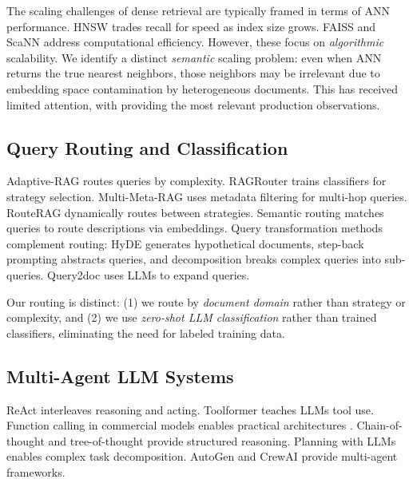 \documentclass[11pt,a4paper]{article}
\begin{document}
The scaling challenges of dense retrieval are typically framed in terms of ANN performance. HNSW \cite{malkov2020hnsw} trades recall for speed as index size grows. FAISS \cite{johnson2021faiss} and ScaNN \cite{guo2020scann} address computational efficiency. However, these focus on \textit{algorithmic} scalability. We identify a distinct \textit{semantic} scaling problem: even when ANN returns the true nearest neighbors, those neighbors may be irrelevant due to embedding space contamination by heterogeneous documents. This has received limited attention, with \citet{barnett2024observations} providing the most relevant production observations.

\subsection{Query Routing and Classification}

Adaptive-RAG \cite{jeong2024adaptiverag} routes queries by complexity. RAGRouter \cite{ragrouter2025} trains classifiers for strategy selection. Multi-Meta-RAG \cite{zohar2024multimetarag} uses metadata filtering for multi-hop queries. RouteRAG \cite{routerag2025} dynamically routes between strategies. Semantic routing \cite{aurelio2024semanticrouter} matches queries to route descriptions via embeddings. Query transformation methods complement routing: HyDE \cite{gao2023hyde} generates hypothetical documents, step-back prompting \cite{zheng2024stepback} abstracts queries, and decomposition \cite{press2023measuring, zhou2023leasttomost} breaks complex queries into sub-queries. Query2doc \cite{wang2023query2doc} uses LLMs to expand queries.

Our routing is distinct: (1) we route by \textit{document domain} rather than strategy or complexity, and (2) we use \textit{zero-shot LLM classification} rather than trained classifiers, eliminating the need for labeled training data.

\subsection{Multi-Agent LLM Systems}

ReAct \cite{yao2023react} interleaves reasoning and acting. Toolformer \cite{schick2023toolformer} teaches LLMs tool use. Function calling in commercial models enables practical architectures \cite{patil2023gorilla, qin2024toolllm}. Chain-of-thought \cite{wei2022chainofthought} and tree-of-thought \cite{yao2024treeofthoughts} provide structured reasoning. Planning with LLMs \cite{huang2022planning} enables complex task decomposition. AutoGen \cite{wu2023autogen} and CrewAI \cite{crewai2024} provide multi-agent frameworks.
\end{document}
